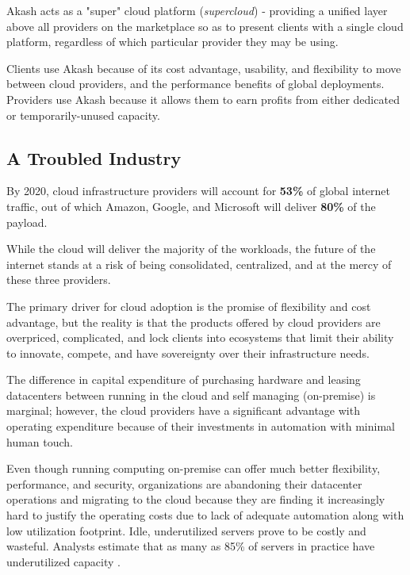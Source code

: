 \documentclass[11pt,english]{article}
\theoremstyle{definition}
\begin{document}
Akash acts as a "super" cloud platform (\textit{supercloud}) - providing a unified layer above all providers on the marketplace so as to present clients with a single cloud platform, regardless of which particular provider they may be using. 

Clients use Akash because of its cost advantage, usability, and flexibility to move between cloud providers, and the performance benefits of global deployments.  Providers use Akash because it allows them to earn profits from either dedicated or temporarily-unused capacity.

\subsection{A Troubled Industry}

By 2020, cloud infrastructure providers will account for \textbf{53\%} of global internet traffic\cite{CISCO}, out of which Amazon, Google, and Microsoft will deliver \textbf{80\% }of the payload\cite{FORRESTER}.

While the cloud will deliver the majority of the workloads, the future of the internet stands at a risk of being consolidated, centralized, and at the mercy of these three providers.

The primary driver for cloud adoption is the promise of flexibility and cost advantage, but the reality is that the products offered by cloud providers are overpriced, complicated, and lock clients into ecosystems that limit their ability to innovate, compete, and have sovereignty over their infrastructure needs.

The difference in capital expenditure of purchasing hardware and leasing datacenters between running in the cloud and self managing (on-premise) is marginal; however, the cloud providers have a significant advantage with operating expenditure because of their investments in automation with minimal human touch.

Even though running computing on-premise can offer much better flexibility, performance, and security, organizations are abandoning their datacenter operations and migrating to the cloud because they are finding it increasingly hard to justify the operating costs due to lack of adequate automation along with low utilization footprint. Idle, underutilized servers prove to be costly and wasteful. Analysts estimate that as many as 85\% of servers in practice have underutilized capacity \cite{NYT} \cite{MCKINSEY} \cite{ACCENTURE} \cite{ANTHESIS}.
\end{document}

